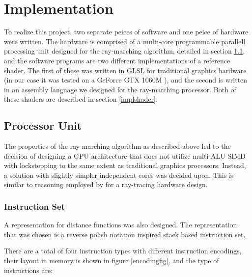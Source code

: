 \chapter{Implementation}
	
	To realize this project, two separate peices of software and one peice of
	hardware were written. The hardware is comprised of a multi-core
	programmable parallell processing unit designed for the ray-marching
	algorithm, detailed in section \ref{implproc}, and the software programs
	are two different implementations of a reference shader.  The first of
	these was written in GLSL for traditional graphics hardware (in our case it
	was tested on a GeForce GTX 1060M ), and the second is written in an assembly language we
	designed for the ray-marching processor. Both of these shaders are
	described in section \ref{implshader}.
	
	\section{Processor Unit} \label{implproc}

		The properties of the ray marching algorithm as described above led to
		the decision of designing a GPU architecture that does not utilize
		multi-ALU SIMD with lockstepping to the same extent as traditional
		graphics processors. Instead, a solution with slightly simpler
		independent cores was decided upon. This is similar to reasoning
		employed by \cite{Woop2005} for a ray-tracing hardware design.
	
		\subsection{Instruction Set}

			A representation for distance functions was also designed. The
			representation that was chosen is a reverse polish notation
			inspired stack based instruction set.
	
			There are a total of four instruction types with different
			instruction encodings, their layout in memory is shown in figure
			\ref{encodingfig}, and the type of instructions are:

